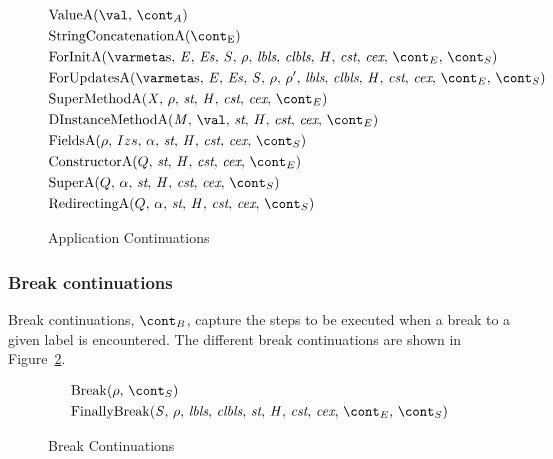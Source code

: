 \documentclass[a4paper,oneside]{article}
\begin{document}
\begin{figure}[Htp]
  \begin{eqfigure}
  \begin{align}
    &\ValueA{\val}{\acont} \label{acont:value}\\
    &\StringConcatenationA \label{acont:stringconcat}\\
    &\ForInitA{\expressionmeta} \label{acont:forinit}\\
    &\ForUpdatesA{\expressionmeta}{\env'} \label{acont:forupdates}\\
    &\SuperMethodA{\strace} \label{acont:supermethod}\\
    &\DInstanceMethodA \label{acont:staticinv}\\
    &\FieldsA{\env}{Izs}{\loc}{\scont} \label{acont:fields}\\
    &\ConstructorA{Q}{\strace}{\econt} \label{acont:constructor}\\
    &\SuperA{Q}{\loc}{\scont} \label{acont:super}\\
    &\RedirectingA{Q}{\loc}{\scont} \label{acont:redirecting}
  \end{align}
  \caption{Application Continuations}
  \label{figure:acont}
  \end{eqfigure}
\end{figure}


\subsubsection{Break continuations}
\label{subsubsec:break-continuations}

Break continuations, $\bcont$, capture the steps to be executed when a break to a given label is encountered.
The different break continuations are shown in Figure~\ref{figure:breakcont}.
\newcommand{\Break}[2]{\mathrm{Break}(#1,\,#2)}
\newcommand{\FinallyBreak}[2]{\mathrm{FinallyBreak}({#1},\,\env,\,\lbls,\,\clbls,\,\strace,\,\handler,\,\cstrace,\,\cex,\,\econt,\,{#2})}

\begin{figure}[Htp]
  \begin{eqfigure}
  \begin{align}
    &\Break{\env}{\scont} \label{breakcont:break} \\
    &\FinallyBreak{\stmt}{\scont} \label{breakcont:finallybreak}
  \end{align}
  \caption{Break Continuations}
  \label{figure:breakcont}
  \end{eqfigure}
\end{figure}
\end{document}

